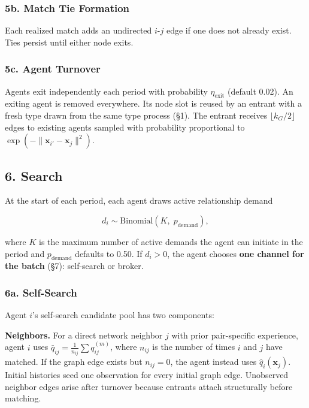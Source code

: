 \documentclass[11pt]{article}
\begin{document}
\subsubsection{5b. Match Tie Formation}\label{b.-match-tie-formation}

Each realized match adds an undirected \(i\)-\(j\) edge if one does not already exist. Ties persist until either node exits.

\subsubsection{5c. Agent Turnover}\label{c.-agent-turnover}

Agents exit independently each period with probability \(\eta_{\mathrm{exit}}\) (default 0.02). An exiting agent is removed everywhere. Its node slot is reused by an entrant with a fresh type drawn from the same type process (§1). The entrant receives \(\lfloor k_G/2 \rfloor\) edges to existing agents sampled with probability proportional to \(\exp(-\|\mathbf{x}_{i'} - \mathbf{x}_j\|^2)\).

\subsection{6. Search}\label{search}

At the start of each period, each agent draws active relationship demand

\[d_i \sim \text{Binomial}(K,\; p_{\text{demand}}),\]

where \(K\) is the maximum number of active demands the agent can initiate in the period and \(p_{\text{demand}}\) defaults to 0.50. If \(d_i > 0\), the agent chooses \textbf{one channel for the batch} (§7): self-search or broker.

\subsubsection{6a. Self-Search}\label{a.-self-search}

Agent \(i\)'s self-search candidate pool has two components:

\textbf{Neighbors.} For a direct network neighbor \(j\) with prior pair-specific experience, agent \(i\) uses \(\bar{q}_{ij} = \frac{1}{n_{ij}} \sum q_{ij}^{(m)}\), where \(n_{ij}\) is the number of times \(i\) and \(j\) have matched. If the graph edge exists but \(n_{ij}=0\), the agent instead uses \(\hat q_i(\mathbf x_j)\). Initial histories seed one observation for every initial graph edge. Unobserved neighbor edges arise after turnover because entrants attach structurally before matching.
\end{document}
